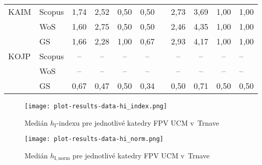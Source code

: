 \begin{table}
\begin{tabularx}{\textwidth}{XXcccc@{\hspace{3ex}}cccc}
    KAIM & Scopus & 1,74  & 2,52 & 0,50 & 0,50 & & 2,73  & 3,69 & 1,00 & 1,00 \\
         & WoS    & 1,60  & 2,75 & 0,50 & 0,50 & & 2,46  & 4,35 & 1,00 & 1,00 \\
         & GS     & 1,66  & 2,28 & 1,00 & 0,67 & & 2,93  & 4,17 & 1,00 & 1,00 \\[1ex]
    KOJP & Scopus & --    & --   & --   & --   & & --    & --   & --   & --   \\
         & WoS    & --    & --   & --   & --   & & --    & --   & --   & --   \\
         & GS     & 0,67  & 0,47 & 0,50 & 0,34 & & 0,50  & 0,71 & 0,50 & 0,50 \\
    \bottomrule
  \end{tabularx}
\end{table}

\begin{figure}
  \centering
  \texttt{[image: plot-results-data-hi\_index.png]}
  \caption{Medián $h_{\mathrm{I}}$-indexu pre jednotlivé katedry FPV UCM v~Trnave}
  \label{fig:hi-index.plot}
\end{figure}

\begin{figure}
  \centering
  \texttt{[image: plot-results-data-hi\_norm.png]}
  \caption{Medián $h_{\mathrm{I,norm}}$ pre jednotlivé katedry FPV UCM v~Trnave}
  \label{fig:hinorm.plot}
\end{figure}

